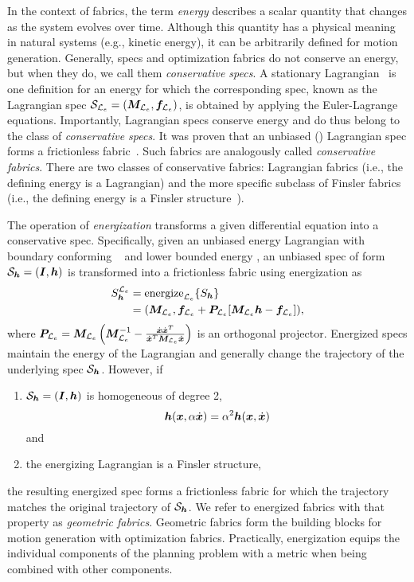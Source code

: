 In the context of fabrics, the term \textit{energy} describes a scalar quantity that
changes as the system evolves over time.  Although this quantity has a physical meaning in
natural systems (e.g., kinetic energy), it can be arbitrarily defined for motion generation.
Generally, specs and optimization fabrics do not conserve an energy, but when they do, we
call them \textit{conservative specs}.  A stationary Lagrangian~\cite[Definition
4.11]{Ratliff2020} is one definition for an energy for which the corresponding spec, known
as the Lagrangian spec $\mathcal{S}_{\mathcal{L}_e} = \left(\bm{M}_{\mathcal{L}_e},\bm{f}_{\mathcal{L}_e}\right)$, is obtained by applying the
Euler-Lagrange equations. Importantly, Lagrangian specs conserve energy and do thus belong
to the class of \textit{conservative specs}.  It was proven that an unbiased
(\cite[Definition~4.11]{Ratliff2020}) Lagrangian spec forms a frictionless
fabric~\cite[Proposition~4.18]{Ratliff2020}. Such fabrics are analogously called
\textit{conservative fabrics}.  There are two classes of conservative fabrics: Lagrangian
fabrics (i.e., the defining energy is a Lagrangian) and the more specific subclass of
Finsler fabrics (i.e., the
defining energy is a Finsler structure~\cite[Definition 5.4]{Ratliff2020}). 

The operation of \textit{energization} transforms a given differential equation into
a conservative spec.
Specifically, given an unbiased energy Lagrangian \le{} with boundary conforming
\Me{}~\cite[Definition~4.6]{Ratliff2020} and
lower bounded energy \he{}, an unbiased spec of form $\mathcal{S}_{\bm{h}} = (\bm{I},\bm{h})$
is transformed into a frictionless fabric using energization as
\begin{equation}
  \begin{split}
  S_{\bm{h}}^{\mathcal{L}_e} &= \text{energize}_{\mathcal{L}_e}\{S_{\bm{h}}\} \\
    &= (\bm{M}_{\mathcal{L}_e}, \bm{f}_{\mathcal{L}_e} + \bm{P}_{\mathcal{L}_e}[\bm{M}_{\mathcal{L}_e}\bm{h} - \bm{f}_{\mathcal{L}_e}]), 
  \end{split}
\end{equation}
where $\bm{P}_{\mathcal{L}_e} = \bm{M}_{\mathcal{L}_e}\left(\bm{M}_{\mathcal{L}_e}^{-1} - \frac{\dot{\bm{x}}\dot{\bm{x}}^T}{\dot{\bm{x}}^T\bm{M}_{\mathcal{L}_e}\dot{\bm{x}}}\right)$ is an
orthogonal projector.
Energized specs maintain the energy of the Lagrangian and generally change
the trajectory of the underlying spec $\mathcal{S}_{\bm{h}}$.
However, if 
\begin{enumerate}
  \item $\mathcal{S}_{\bm{h}} = (\bm{I},\bm{h})$ is homogeneous of degree 2,
    \begin{equation}\bm{h}(\bm{x}, \alpha\dot{\bm{x}}) = \alpha^2\bm{h}(\bm{x}, \dot{\bm{x}})\label{eq:homogeneous}\end{equation}
    and
  \item the energizing Lagrangian is a Finsler structure, 
\end{enumerate}
the resulting energized spec forms a frictionless fabric for which the trajectory matches
the original trajectory of $\mathcal{S}_{\bm{h}}$. We refer to energized fabrics with that
property as \textit{geometric fabrics}. Geometric fabrics form the building blocks for
motion generation with optimization fabrics.
Practically, energization equips the individual components of the planning problem
with a metric when being combined with other components.


